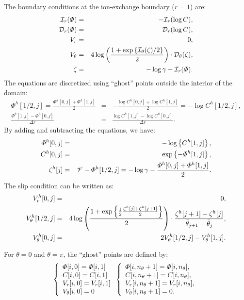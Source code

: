 The boundary conditions at the ion-exchange boundary ($r=1$) are:
\begin{eqnarray}
\cI_r(\varPhi) &=& -\cI_r(\log C), \\
\cD_r(\varPhi) &=& \cD_r(\log C), \\
V_r &=& 0, \\
V_\theta &=& 4\log\pars{\frac{1 + \exp\left\{\cI_\theta(\zeta)/2\right\}}{2}} \cdot 
			\cD_\theta(\zeta), \\
  \zeta &=& - \log \gamma - \cI_r(\varPhi).
\end{eqnarray}
The equations are discretized using ``ghost'' points outside the interior of the domain:
\begin{eqnarray}
 \varPhi^h[1/2, j] = \frac{\varPhi^h[0,j] + \varPhi^h[1,j]}{2} &=& 
	-\frac{\log C^h[0,j] + \log C^h[1,j]}{2} = -\log C^h[1/2, j], \\
  \frac{\varPhi^h[1,j] - \varPhi^h[0,j]}{\Delta r} &=& 
	\frac{\log C^h[1,j] - \log C^h[0,j]}{\Delta r}. 
\end{eqnarray}
By adding and subtracting the equations, we have:
\begin{eqnarray}
\varPhi^h[0,j] &=& -\log\brcs{C^h[1,j]}, \\
C^h[0,j] &=& \exp\brcs{-\varPhi^h[1,j]}, \\
  \zeta^h[j] &=& \cV - \varPhi^h[1/2,j]
                     = -\log\gamma -\frac{\varPhi^h[0,j] + \varPhi^h[1,j]}{2}.
\end{eqnarray}
The slip condition can be written as:
\begin{eqnarray}
V_r^h[0,j] &=& 0, \\
V_\theta^h[1/2,j] &=& 
4\log\pars{\frac{1 + \exp\left\{\frac{1}{2}
 \frac{\zeta^h[j] + \zeta^h[j+1]}{2}\right\}}{2}} 
\cdot \frac{\zeta^h[j+1] - \zeta^h[j]}{\bar{\theta}_{j+1} - \bar{\theta}_{j}}, \\
  V^h_\theta[0,j] &=& 2 V^h_\theta[1/2, j] - V^h_\theta[1,j].
\end{eqnarray}

For $\theta = 0$ and $\theta = \pi$, the ``ghost'' points are defined by:
\begin{eqnarray} 
\brc{l}{
\varPhi[i, 0] = \varPhi[i, 1] \\
C[i, 0] = C[i, 1] \\
V_r[i, 0] = V_r[i, 1] \\
V_\theta[i, 0] = 0
} 
\brc{l}{
\varPhi[i, n_\theta+1] = \varPhi[i, n_\theta], \\
C[i, n_\theta+1] = C[i, n_\theta], \\
V_r[i, n_\theta+1] = V_r[i, n_\theta], \\
V_\theta[i, n_\theta+1] = 0.
} 
\end{eqnarray}

